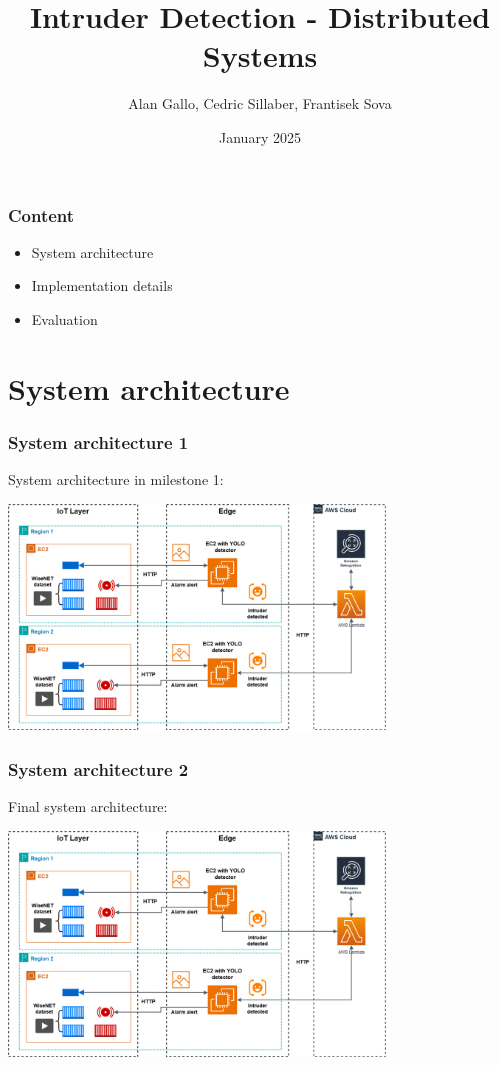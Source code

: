 \documentclass{beamer}
\title{Intruder Detection - Distributed Systems}
\author{Alan Gallo, Cedric Sillaber, Frantisek Sova}
\date{January 2025}
\begin{document}
\frame{\titlepage}



\begin{frame}
    \frametitle{Content}
    \begin{itemize}
        \item System architecture
        \item Implementation details
        \item Evaluation
    \end{itemize}
\end{frame}


\section{System architecture}
\begin{frame}

\frametitle{System architecture 1}
System architecture in milestone 1:
\begin{center}
    \includegraphics[width=0.75\textwidth]{./res/DS_architecture_version2.png}\\
\end{center}
\end{frame}

\begin{frame}
\frametitle{System architecture 2}
Final system architecture:


\begin{center}
    \includegraphics[width=0.75\textwidth]{./res/DS_architecture_version2.png}\\
\end{center}
\end{frame}
\end{document}
